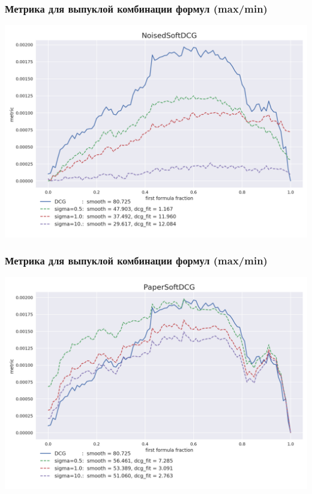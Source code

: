 \documentclass[10pt]{beamer}
\begin{document}
\begin{frame}
\frametitle{Метрика для выпуклой комбинации формул (max/min)}
\includegraphics[width=\textwidth]{noised_formula_mix}
\end{frame}


\begin{frame}
\frametitle{Метрика для выпуклой комбинации формул (max/min)}
\includegraphics[width=\textwidth]{paper_formula_mix}
\end{frame}
\end{document}
